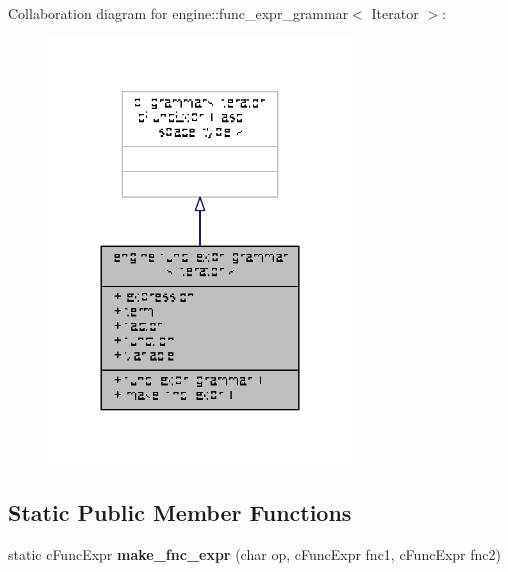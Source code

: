 Collaboration diagram for engine\-:\-:func\-\_\-expr\-\_\-grammar$<$ Iterator $>$\-:
\nopagebreak
\begin{figure}[H]
\begin{center}
\leavevmode
\includegraphics[width=228pt]{structengine_1_1func__expr__grammar__coll__graph}
\end{center}
\end{figure}
\subsection*{Static Public Member Functions}
\begin{DoxyCompactItemize}
\item 
\hypertarget{structengine_1_1func__expr__grammar_a9e2b18907587d9006bcc1bb65c31de12}{static c\-Func\-Expr {\bfseries make\-\_\-fnc\-\_\-expr} (char op, c\-Func\-Expr fnc1, c\-Func\-Expr fnc2)}\label{structengine_1_1func__expr__grammar_a9e2b18907587d9006bcc1bb65c31de12}

\end{DoxyCompactItemize}
